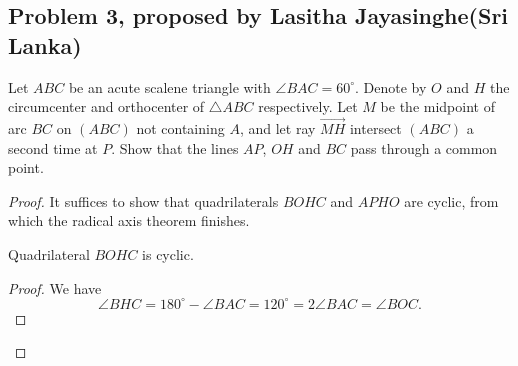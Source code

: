 \documentclass[11pt]{scrartcl}
\begin{document}
\newpage{}

\subsection{Problem 3, proposed by Lasitha Jayasinghe(Sri Lanka)}

\begin{problem}
    Let $ABC$ be an acute scalene triangle with $\angle BAC=60^\circ$. Denote by $O$ and $H$ the circumcenter and orthocenter of
    $\triangle ABC$ respectively. Let $M$ be the midpoint of arc $BC$ on $(ABC)$ not containing $A$, and let ray $\overrightarrow{MH}$
    intersect $(ABC)$ a second time at $P$. Show that the lines $AP$, $OH$ and $BC$ pass through a common point.
\end{problem}

\begin{proof}
    It suffices to show that quadrilaterals $BOHC$ and $APHO$ are cyclic, from which the radical axis theorem finishes.

    \begin{claim}
        Quadrilateral $BOHC$ is cyclic.
        \begin{proof}
            We have
            \[
            \angle BHC = 180^\circ - \angle BAC = 120^\circ = 2\angle BAC = \angle BOC.
            \]
        \end{proof}
    \end{claim}


\end{proof}
\end{document}
